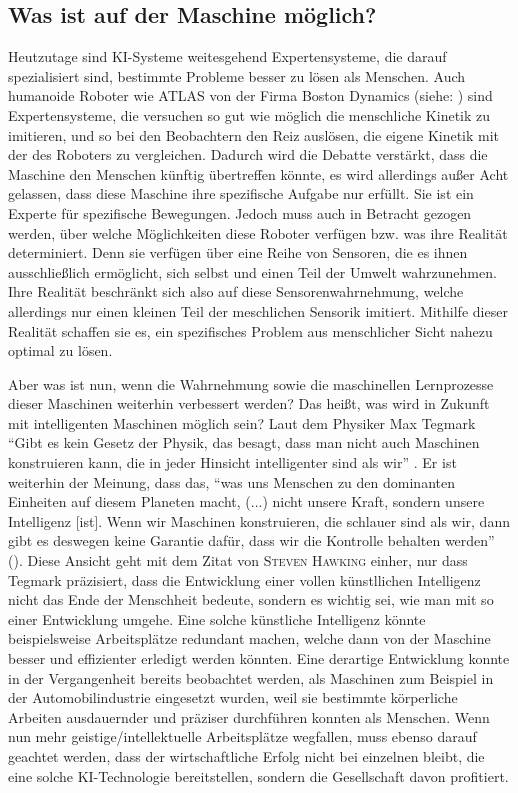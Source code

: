 \documentclass[a4paper, 11pt]{scrartcl}
\begin{document}
\subsection{Was ist auf der Maschine möglich?}
Heutzutage sind KI-Systeme weitesgehend Expertensysteme, die darauf spezialisiert sind, bestimmte Probleme besser zu lösen als Menschen. Auch humanoide Roboter wie ATLAS von der Firma Boston Dynamics (siehe: \cite{Atlas2019}) sind Expertensysteme, die versuchen so gut wie möglich die menschliche Kinetik zu imitieren, und so bei den Beobachtern den Reiz auslösen, die eigene Kinetik mit der des Roboters zu vergleichen. Dadurch wird die Debatte verstärkt, dass die Maschine den Menschen künftig übertreffen könnte, es wird allerdings außer Acht gelassen, dass diese Maschine ihre spezifische Aufgabe nur erfüllt. Sie ist ein Experte für spezifische Bewegungen. Jedoch muss auch in Betracht gezogen werden, über welche Möglichkeiten diese Roboter verfügen bzw. was ihre Realität determiniert. Denn sie verfügen über eine Reihe von Sensoren, die es ihnen ausschließlich ermöglicht, sich selbst und einen Teil der Umwelt wahrzunehmen. Ihre Realität beschränkt sich also auf diese Sensorenwahrnehmung, welche allerdings nur einen kleinen Teil der meschlichen Sensorik imitiert. Mithilfe dieser Realität schaffen sie es, ein spezifisches Problem aus menschlicher Sicht nahezu optimal zu lösen.

Aber was ist nun, wenn die Wahrnehmung sowie die maschinellen Lernprozesse dieser Maschinen weiterhin verbessert werden? Das heißt, was wird in Zukunft mit intelligenten Maschinen möglich sein? Laut dem Physiker Max Tegmark ``Gibt es kein Gesetz der Physik, das besagt, dass man nicht auch Maschinen konstruieren kann, die in jeder Hinsicht intelligenter sind als wir'' \cite{Tegmark2017}. Er ist weiterhin der Meinung, dass das, ``was uns Menschen zu den dominanten Einheiten auf diesem Planeten macht, (...) nicht unsere Kraft, sondern unsere Intelligenz [ist]. Wenn wir Maschinen konstruieren, die schlauer sind als wir, dann gibt es deswegen keine Garantie dafür, dass wir die Kontrolle behalten werden'' (\cite{Tegmark2017}). Diese Ansicht geht mit dem Zitat von \textsc{Steven Hawking} einher, nur dass Tegmark präzisiert, dass die Entwicklung einer vollen künstllichen Intelligenz nicht das Ende der Menschheit bedeute, sondern es wichtig sei, wie man mit so einer Entwicklung umgehe. Eine solche künstliche Intelligenz könnte beispielsweise Arbeitsplätze redundant machen, welche dann von der Maschine besser und effizienter erledigt werden könnten. Eine derartige Entwicklung konnte in der Vergangenheit bereits beobachtet werden, als Maschinen zum Beispiel in der Automobilindustrie eingesetzt wurden, weil sie bestimmte körperliche Arbeiten ausdauernder und präziser durchführen konnten als Menschen. Wenn nun mehr geistige/intellektuelle Arbeitsplätze wegfallen, muss ebenso darauf geachtet werden, dass der wirtschaftliche Erfolg nicht bei einzelnen bleibt, die eine solche KI-Technologie bereitstellen, sondern die Gesellschaft davon profitiert.
\end{document}
